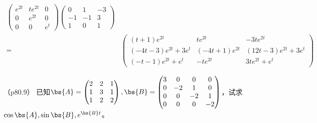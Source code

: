 \documentclass[12pt, a4paper, oneside, UTF8]{ctexbook}
\begin{document}
\begin{solution}
\begin{align*}
\begin{pmatrix}
        e^{2t}& te^{2t} & 0 \\
        0 & e^{2t} & 0 \\
        0& 0 &e^{t}
    \end{pmatrix}
    \begin{pmatrix}
        0 & 1 &-3 \\
        -1 & -1 &3 \\
        1 & 0 & 1         
    \end{pmatrix}\\
    =&\begin{pmatrix}
        (t+1)e^{2t}& te^{2t} & -3te^{2t} \\
        (-4t-3)e^{2t}+3e^t & (-4t+1)e^{2t} & (12t-3)e^{2t}+3e^{t} \\
       (-t-1)e^{2t}+e^{t}& -te^{2t} &3te^{2t}+e^{t}
    \end{pmatrix}
    \end{align*}
\end{solution}


\begin{question}（p80.9）
    已知$\bs{A}=\begin{pmatrix}
        2 & 2 & 1\\
        1 &3 &1 \\
        1 &2 &2
    \end{pmatrix},\bs{B}=\begin{pmatrix}
        3 & 0 & 0 &0 \\
        0 & -2 & 1 &0 \\
        0 & 0 & -2 &1 \\
        0 & 0 & 0 &-2 \\
    \end{pmatrix}$，试求$\cos \bs{A},\sin \bs{B},e^{\bs{B}t}$。
\end{question}
\end{document}
